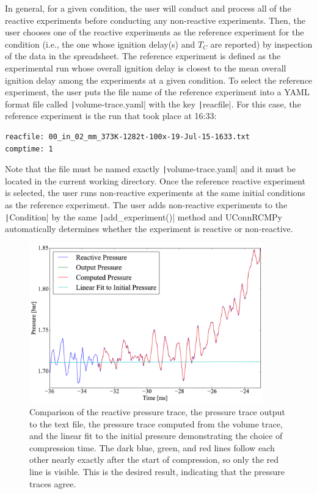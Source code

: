\documentclass[12pt]{../ussci}
\begin{document}
In general, for a given condition, the user will conduct and process all
of the reactive experiments before conducting any non-reactive
experiments. Then, the user chooses one of the reactive experiments as
the reference experiment for the condition (i.e., the one whose ignition
delay(s) and \(T_C\) are reported) by inspection of the data in the
spreadsheet. The reference experiment is defined as the experimental run
whose overall ignition delay is closest to the mean overall ignition
delay among the experiments at a given condition. To select the
reference experiment, the user puts the file name of the reference
experiment into a YAML format file called \texttt|volume-trace.yaml|
with the key \texttt|reacfile|. For this case, the reference experiment
is the run that took place at 16:33:

\begin{verbatim}
reacfile: 00_in_02_mm_373K-1282t-100x-19-Jul-15-1633.txt
comptime: 1
\end{verbatim}

Note that the file must be named exactly \texttt|volume-trace.yaml| and
it must be located in the current working directory. Once the reference
reactive experiment is selected, the user runs non-reactive experiments
at the same initial conditions as the reference experiment. The user
adds non-reactive experiments to the \texttt|Condition| by the same
\texttt|add_experiment()| method and UConnRCMPy automatically
determines whether the experiment is reactive or non-reactive.

\begin{figure}[htbp]
\centering
\includegraphics[width=0.9\textwidth]{figures/pressure-comparison.png}
\caption{Comparison of the reactive pressure trace, the pressure trace
output to the text file, the pressure trace computed from the volume
trace, and the linear fit to the initial pressure demonstrating the
choice of compression time. The dark blue, green, and red lines follow
each other nearly exactly after the start of compression, so only the
red line is visible. This is the desired result, indicating that the
pressure traces agree.}
\label{fig:pressure-comparison}
\end{figure}
\end{document}
